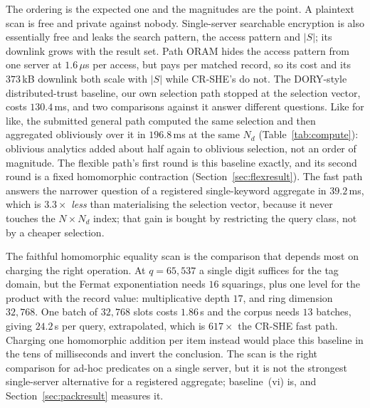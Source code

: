 \documentclass[a4paper,fleqn]{cas-dc}
\begin{document}
The ordering is the expected one and the magnitudes are the point. A plaintext
scan is free and private against nobody. Single-server searchable encryption
is also essentially free and leaks the search pattern, the access pattern and
$|S|$; its downlink grows with the result set. Path ORAM hides the access
pattern from one server at $1.6\,\mu$s per access, but pays per matched
record, so its cost and its $373$\,kB downlink both scale with $|S|$ while
CR-SHE's do not. The DORY-style distributed-trust baseline, our own selection
path stopped at the selection vector, costs $130.4$\,ms, and two comparisons
against it answer different questions. Like for like, the submitted general
path computed the same selection and then aggregated obliviously over it in
$196.8$\,ms at the same $N_d$ (Table~\ref{tab:compute}): oblivious analytics
added about half again to oblivious selection, not an order of magnitude. The
flexible path's first round is this baseline exactly, and its second round is
a fixed homomorphic contraction (Section~\ref{sec:flexresult}). The
fast path answers the narrower question of a registered single-keyword
aggregate in $39.2$\,ms, which is $3.3\times$ \emph{less} than materialising
the selection vector, because it never touches the $N\times N_d$ index; that
gain is bought by restricting the query class, not by a cheaper selection.

The faithful homomorphic equality scan is the comparison that depends most on
charging the right operation. At $q=65{,}537$ a single digit suffices for the
tag domain, but the Fermat exponentiation needs $16$ squarings, plus one level
for the product with the record value: multiplicative depth $17$, and ring
dimension $32{,}768$. One batch of $32{,}768$ slots costs $1.86$\,s and the
corpus needs $13$ batches, giving $24.2$\,s per query, extrapolated, which is
$617\times$ the CR-SHE fast path. Charging one homomorphic addition per item
instead would place this baseline in the tens of milliseconds and invert the
conclusion. The scan is the right comparison for ad-hoc predicates on a single
server, but it is not the strongest single-server alternative for a registered
aggregate; baseline~(vi) is, and Section~\ref{sec:packresult} measures it.
\end{document}
